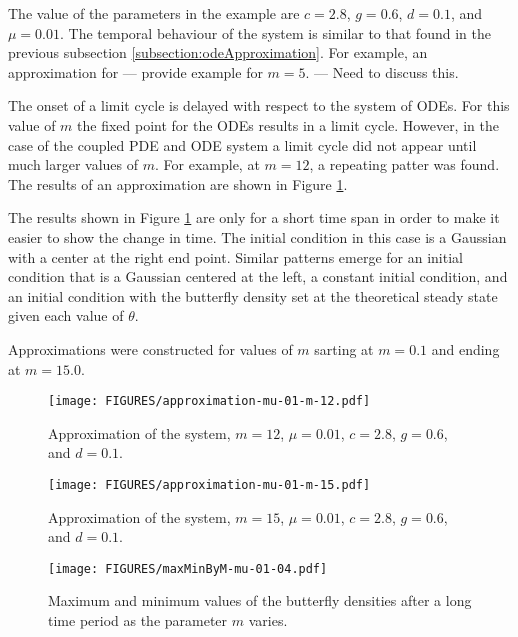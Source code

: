 \documentclass[review,authoryear]{elsarticle}
\begin{document}
The value of the parameters in the example are $c=2.8$, $g=0.6$,
$d=0.1$, and $\mu=0.01$. The temporal behaviour of the system is
similar to that found in the previous subsection
\ref{subsection:odeApproximation}. For example, an approximation for
--- provide example for $m=5$. --- Need to discuss this.

The onset of a limit cycle is delayed with respect to the system of
ODEs. For this value of $m$ the fixed point for the ODEs results in a
limit cycle. However, in the case of the coupled PDE and ODE system a
limit cycle did not appear until much larger values of $m$. For
example, at $m=12$, a repeating patter was found. The results of an
approximation are shown in Figure \ref{fig:approximationM12Mu01}.

The results shown in Figure \ref{fig:approximationM12Mu01} are only
for a short time span in order to make it easier to show the change in
time. The initial condition in this case is a Gaussian with a center
at the right end point.  Similar patterns emerge for an initial
condition that is a Gaussian centered at the left, a constant initial
condition, and an initial condition with the butterfly density set at
the theoretical steady state given each value of $\theta$.


Approximations were constructed for
values of $m$ sarting at $m=0.1$ and ending at $m=15.0$.


\begin{figure}[htb]
  \centering
  \texttt{[image: FIGURES/approximation-mu-01-m-12.pdf]}
  \caption[Approximation with $m=12$ and $\mu=0.01$.]{Approximation of
    the system, $m=12$, $\mu=0.01$, $c=2.8$, $g=0.6$, and $d=0.1$. }
  \label{fig:approximationM12Mu01}
\end{figure}

\begin{figure}[htb]
  \centering
  \texttt{[image: FIGURES/approximation-mu-01-m-15.pdf]}
  \caption[Approximation with $m=15$ and $\mu=0.01$.]{Approximation of
    the system, $m=15$, $\mu=0.01$, $c=2.8$, $g=0.6$, and $d=0.1$. }
  \label{fig:approximationM15Mu01}
\end{figure}

\begin{figure}[htb]
  \centering
  \texttt{[image: FIGURES/maxMinByM-mu-01-04.pdf]}
  \caption[Maximum and minimum values of the butterfly
  density]{Maximum and minimum values of the butterfly densities after
    a long time period as the parameter $m$ varies.}
  \label{fig:maxMinButterflySmallMu}
\end{figure}
\end{document}
